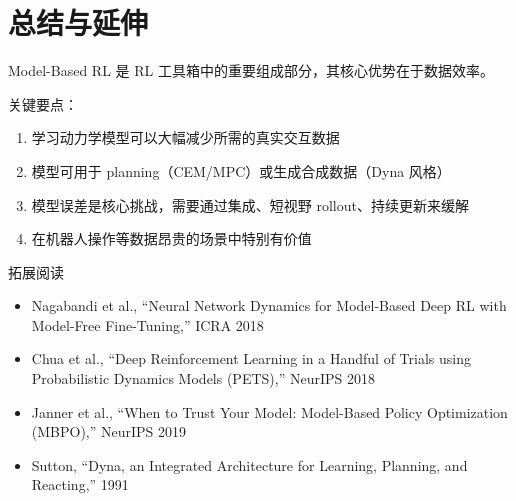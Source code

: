 \section{总结与延伸}

Model-Based RL 是 RL 工具箱中的重要组成部分，其核心优势在于数据效率。

关键要点：
\begin{enumerate}
    \item 学习动力学模型可以大幅减少所需的真实交互数据
    \item 模型可用于 planning（CEM/MPC）或生成合成数据（Dyna 风格）
    \item 模型误差是核心挑战，需要通过集成、短视野 rollout、持续更新来缓解
    \item 在机器人操作等数据昂贵的场景中特别有价值
\end{enumerate}

\begin{knowledgebox}{拓展阅读}
\begin{itemize}
    \item Nagabandi et al., ``Neural Network Dynamics for Model-Based Deep RL with Model-Free Fine-Tuning,'' ICRA 2018
    \item Chua et al., ``Deep Reinforcement Learning in a Handful of Trials using Probabilistic Dynamics Models (PETS),'' NeurIPS 2018
    \item Janner et al., ``When to Trust Your Model: Model-Based Policy Optimization (MBPO),'' NeurIPS 2019
    \item Sutton, ``Dyna, an Integrated Architecture for Learning, Planning, and Reacting,'' 1991
\end{itemize}
\end{knowledgebox}


